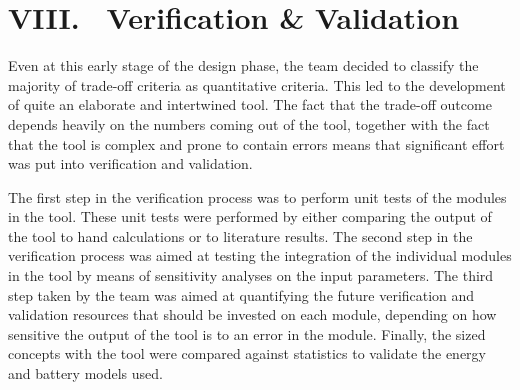 
\section*{VIII. \ Verification \& Validation }
\label{ES.VandV}

Even at this early stage of the design phase, the team decided to classify the majority of trade-off criteria as quantitative criteria. This led to the development of quite an elaborate and intertwined tool. The fact that the trade-off outcome depends heavily on the numbers coming out of the tool, together with the fact that the tool is complex and prone to contain errors means that significant effort was put into verification and validation.

The first step in the verification process was to perform unit tests of the modules in the tool. These unit tests were performed by either comparing the output of the tool to hand calculations or to literature results. The second step in the verification process was aimed at testing the integration of the individual modules in the tool by means of sensitivity analyses on the input parameters. The third step taken by the team was aimed at quantifying the future verification and validation resources that should be invested on each module, depending on how sensitive the output of the tool is to an error in the module. Finally, the sized concepts with the tool were compared against statistics to validate the energy and battery models used.